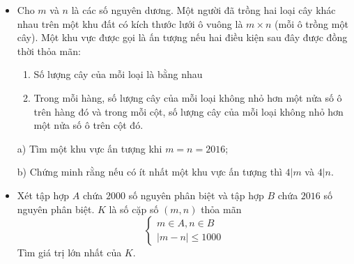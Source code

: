\documentclass[11pt]{scrartcl}
\begin{document}
\begin{itemize}[label=, leftmargin=0em, itemsep=0.5em]
    \item \begin{btvn}
        Cho $m$ và $n$ là các số nguyên dương. Một người đã trồng hai loại cây khác nhau trên một khu đất có kích thước lưới ô vuông là $m \times n$ (mỗi ô trồng một cây). Một khu vực được gọi là ấn tượng nếu hai điều kiện sau đây được đồng thời thỏa mãn:
        \begin{enumerate}
            \item Số lượng cây của mỗi loại là bằng nhau
            \item Trong mỗi hàng, số lượng cây của mỗi loại không nhỏ hơn một nửa số ô trên hàng đó và trong mỗi cột, số lượng cây của mỗi loại không nhỏ hơn một nửa số ô trên cột đó.
        \end{enumerate}
        a) Tìm một khu vực ấn tượng khi $m=n=2016$;


        b) Chứng minh rằng nếu có ít nhất một khu vực ấn tượng thì $4|m$ và $4|n$.

    \end{btvn}

    \item \begin{btvn}
    Xét tập hợp $A$ chứa $2000$ số nguyên phân biệt và tập hợp $B$ chứa $2016$ số nguyên phân biệt. $K$ là số cặp số $(m, n)$ thỏa mãn
    \[ \begin{cases} m\in A, n\in B\\ |m-n|\leq 1000 \end{cases} \]
    Tìm giá trị lớn nhất của $K$.
    \end{btvn}


\end{itemize}
\end{document}
